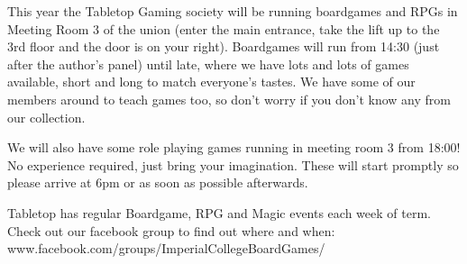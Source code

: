 This year the Tabletop Gaming society will be running boardgames and RPGs in Meeting Room 3 of the union (enter the main entrance, take the lift up to the 3rd floor and the door is on your right). Boardgames will run from 14:30 (just after the author’s panel) until late, where we have lots and lots of games available, short and long to match everyone’s tastes.  We have some of our members around to teach games too, so don’t worry if you don’t know any from our collection.
 
We will also have some role playing games running in meeting room 3 from 18:00! No experience required, just bring your imagination. These will start promptly so please arrive at 6pm or as soon as possible afterwards.
 
Tabletop has regular Boardgame, RPG and Magic events each week of term. Check out our facebook group to find out where and when: www.facebook.com/groups/ImperialCollegeBoardGames/

